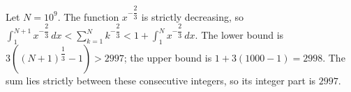 Let $N=10^9$. The function $x^{- \dfrac{2}{3}}$ is strictly decreasing, so $\int_1^{N+1} x^{- \dfrac{2}{3}} \, d x < \sum_{k=1}^{N} k^{- \dfrac{2}{3}} < 1 + \int_1^N x^{- \dfrac{2}{3}} \, d x$. The lower bound is $3 ((N+1)^{\dfrac{1}{3}} - 1) > 2997$; the upper bound is $1+3(1000-1)=2998$. The sum lies strictly between these consecutive integers, so its integer part is $\boxed{2997}$.
